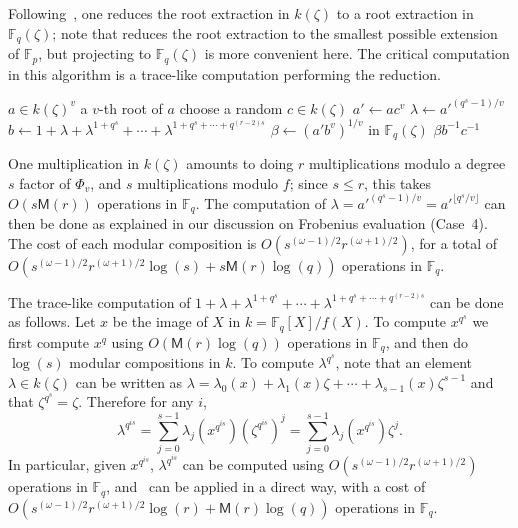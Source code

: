 \documentclass{mcom-l}
\theoremstyle{plain}
\theoremstyle{definition}
\newcommand{\F}{\ensuremath{\mathbb{F}}}
\newcommand{\MM}{\ensuremath{\mathsf{M}}}
\newcounter{algorithm}
\begin{document}
Following~\cite[Algorithm~3]{doliskanischost2011}, one reduces the
root extraction in $k(\zeta)$ to a root extraction in $\F_q(\zeta)$;
note that \cite[Algorithm~3]{doliskanischost2011} reduces the root
extraction to the smallest possible extension of $\F_p$, but
projecting to $\F_q(\zeta)$ is more convenient here. The critical
computation in this algorithm is a trace-like computation performing
the reduction.

\begin{algorithm}
\label{algorithm:new}
\begin{algorithmic}[1]
\REQUIRE $a \in k(\zeta)^v$
\ENSURE a $v$-th root of $a$
\REPEAT
\STATE choose a random $c \in k(\zeta)$
\STATE $a'\leftarrow ac^v$
\STATE $\lambda \leftarrow {a'}^{(q^s-1)/v}$
\STATE $b \leftarrow 1 + \lambda + \lambda^{1+q^{s}} + \cdots + \lambda^{1+q^{s}+\cdots+q^{(r-2)s}}$
\STATE $\beta \leftarrow (a'b^v)^{1/v}$ in $\F_q(\zeta)$
\RETURN $\beta b^{-1}c^{-1}$
\end{algorithmic}
\end{algorithm}

One multiplication in $k(\zeta)$ amounts to doing $r$ multiplications
modulo a degree $s$ factor of $\Phi_v$, and $s$ multiplications modulo
$f$; since $s \le r$, this takes $O(s \MM(r))$ operations in $\F_q$.
The computation of $\lambda = {a'}^{(q^s - 1)/v}= {a'}^{\lfloor
  q^s/v\rfloor}$ can then be done as explained in our discussion on
Frobenius evaluation (Case~4). The cost of each modular composition
 is $O(s^{(\omega-1)/2} r^{(\omega+1)/2})$, for a 
total of $O(s^{(\omega-1)/2} r^{(\omega+1)/2}\log(s) +
s\MM(r)\log(q))$ operations in $\F_q$.


The trace-like computation of $1 + \lambda + \lambda^{1+q^{s}} +
\cdots + \lambda^{1+q^{s}+\cdots+q^{(r-2)s}}$ can be done as follows.
Let $x$ be the image of $X$ in $k=\F_q[X]/f(X)$.  To compute $x^{q^s}$
we first compute $x^q$ using $O(\MM(r)\log(q))$ operations in $\F_q$,
and then do $\log(s)$ modular compositions in $k$.  To compute
$\lambda^{q^s}$, note that an element $\lambda \in k(\zeta)$ can be
written as $\lambda = \lambda_0(x) + \lambda_1(x) \zeta + \cdots +
\lambda_{s - 1}(x) \zeta^{s - 1}$ and that $\zeta^{q^s} = \zeta$.
Therefore for any $i$,
\[
\lambda^{q^{i s}} = \sum_{j = 0}^{s - 1} \lambda_j(x^{q^{i s}}) \left(\zeta^{q^{i s}}\right)^j = \sum_{j = 0}^{s - 1} \lambda_j(x^{q^{i s}}) \zeta^j.
\]
In particular, given $x^{q^{i s}}$, $\lambda^{q^{is}}$ can be computed using $O(s^{(\omega-1)/2}r^{(\omega+1)/2})$ operations in $\F_q$,
and~\cite[Algorithm~2]{doliskanischost2011} can be applied in a direct
way, with a cost of $O(s^{(\omega-1)/2}r^{(\omega+1)/2}\log(r) + \MM(r)\log(q))$ operations in $\F_q$.
\end{document}
